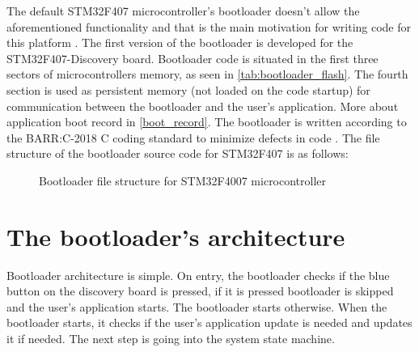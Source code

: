 The default STM32F407 microcontroller's bootloader doesn't allow the aforementioned functionality and that is the main motivation for writing code for this platform \citep{stm32f407_ref_man}. The first version of the bootloader is developed for the STM32F407-Discovery board. Bootloader code is situated in the first three sectors of microcontrollers memory, as seen in \autoref{tab:bootloader_flash}. The fourth section is used as persistent memory (not loaded on the code startup) for communication between the bootloader and the user's application. More about application boot record in \autoref{boot_record}. The bootloader is written according to the BARR:C-2018 C coding standard to minimize defects in code \citep{barr_c}. The file structure of the bootloader source code for STM32F407 is as follows:
\begin{figure}[H]
\caption{Bootloader file structure for STM32F4007 microcontroller}
\label{tree:bootloader}
\end{figure}

\section{The bootloader's architecture}

Bootloader architecture is simple. On entry, the bootloader checks if the blue button on the discovery board is pressed, if it is pressed bootloader is skipped and the user's application starts. The bootloader starts otherwise. When the bootloader starts, it checks if the user's application update is needed and updates it if needed. The next step is going into the system state machine.

